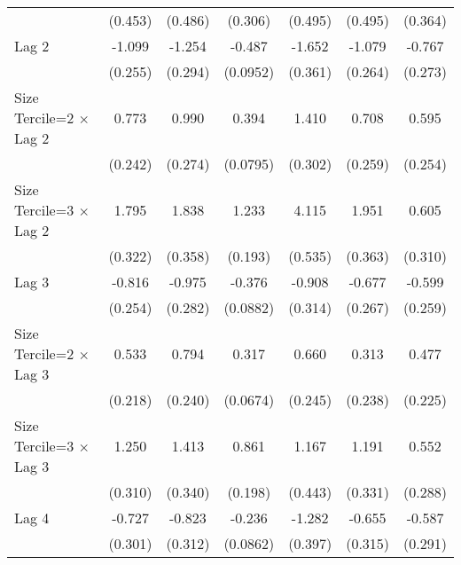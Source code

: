 \begin{table}[htbp]
\begin{tabular}{l*{6}{c}}
                &  (0.453)         &  (0.486)         &  (0.306)         &  (0.495)         &  (0.495)         &  (0.364)         \\
\addlinespace
Lag 2           &   -1.099\sym{***}&   -1.254\sym{***}&   -0.487\sym{***}&   -1.652\sym{***}&   -1.079\sym{***}&   -0.767\sym{**} \\
                &  (0.255)         &  (0.294)         & (0.0952)         &  (0.361)         &  (0.264)         &  (0.273)         \\
\addlinespace
Size Tercile=2 $\times$ Lag 2&    0.773\sym{**} &    0.990\sym{***}&    0.394\sym{***}&    1.410\sym{***}&    0.708\sym{**} &    0.595\sym{*}  \\
                &  (0.242)         &  (0.274)         & (0.0795)         &  (0.302)         &  (0.259)         &  (0.254)         \\
\addlinespace
Size Tercile=3 $\times$ Lag 2&    1.795\sym{***}&    1.838\sym{***}&    1.233\sym{***}&    4.115\sym{***}&    1.951\sym{***}&    0.605         \\
                &  (0.322)         &  (0.358)         &  (0.193)         &  (0.535)         &  (0.363)         &  (0.310)         \\
\addlinespace
Lag 3           &   -0.816\sym{**} &   -0.975\sym{***}&   -0.376\sym{***}&   -0.908\sym{**} &   -0.677\sym{*}  &   -0.599\sym{*}  \\
                &  (0.254)         &  (0.282)         & (0.0882)         &  (0.314)         &  (0.267)         &  (0.259)         \\
\addlinespace
Size Tercile=2 $\times$ Lag 3&    0.533\sym{*}  &    0.794\sym{***}&    0.317\sym{***}&    0.660\sym{**} &    0.313         &    0.477\sym{*}  \\
                &  (0.218)         &  (0.240)         & (0.0674)         &  (0.245)         &  (0.238)         &  (0.225)         \\
\addlinespace
Size Tercile=3 $\times$ Lag 3&    1.250\sym{***}&    1.413\sym{***}&    0.861\sym{***}&    1.167\sym{**} &    1.191\sym{***}&    0.552         \\
                &  (0.310)         &  (0.340)         &  (0.198)         &  (0.443)         &  (0.331)         &  (0.288)         \\
\addlinespace
Lag 4           &   -0.727\sym{*}  &   -0.823\sym{**} &   -0.236\sym{**} &   -1.282\sym{**} &   -0.655\sym{*}  &   -0.587\sym{*}  \\
                &  (0.301)         &  (0.312)         & (0.0862)         &  (0.397)         &  (0.315)         &  (0.291)         \\

\end{tabular}
\end{table}
